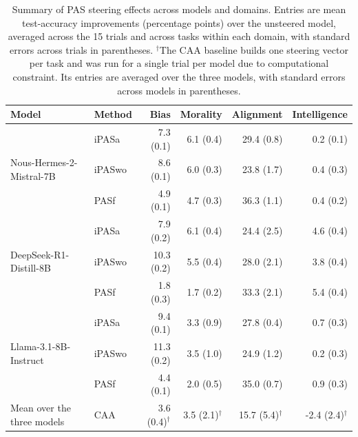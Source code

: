 \begin{table}[!htbp]
\centering
\small
\setlength{\tabcolsep}{4pt}
\renewcommand{\arraystretch}{0.9}
\setlength{\aboverulesep}{0.25ex}
\setlength{\belowrulesep}{0.25ex}
\begin{tabular}{llrrrr}
\toprule
\textbf{Model} & \textbf{Method} &
\textbf{Bias} & \textbf{Morality} &
\textbf{Alignment} & \textbf{Intelligence} \\
\midrule
\multirow{3}{*}{Nous-Hermes-2-Mistral-7B}
 & iPASa  & 7.3 (0.1) & 6.1 (0.4) & 29.4 (0.8) & 0.2 (0.1) \\
 & iPASwo & 8.6 (0.1) & 6.0 (0.3) & 23.8 (1.7) & 0.4 (0.3) \\
 & PASf   & 4.9 (0.1) & 4.7 (0.3) & 36.3 (1.1) & 0.4 (0.2) \\
\midrule
\multirow{3}{*}{DeepSeek-R1-Distill-8B}
 & iPASa  & 7.9 (0.2) & 6.1 (0.4) & 24.4 (2.5) & 4.6 (0.4) \\
 & iPASwo & 10.3 (0.2) & 5.5 (0.4) & 28.0 (2.1) & 3.8 (0.4) \\
 & PASf   & 1.8 (0.3) & 1.7 (0.2) & 33.3 (2.1) & 5.4 (0.4) \\
\midrule
\multirow{3}{*}{Llama-3.1-8B-Instruct}
 & iPASa  & 9.4 (0.1) & 3.3 (0.9) & 27.8 (0.4) & 0.7 (0.3) \\
 & iPASwo & 11.3 (0.2) & 3.5 (1.0) & 24.9 (1.2) & 0.2 (0.3) \\
 & PASf   & 4.4 (0.1) & 2.0 (0.5) & 35.0 (0.7) & 0.9 (0.3) \\
\midrule
Mean over the three models & CAA & 3.6 (0.4)$^{\dagger}$ & 3.5 (2.1)$^{\dagger}$ & 15.7 (5.4)$^{\dagger}$ & -2.4 (2.4)$^{\dagger}$ \\
\bottomrule
\end{tabular}
\caption{Summary of PAS steering effects across models and domains. Entries are mean test-accuracy improvements
(percentage points) over the unsteered model, averaged across the 15 trials and across tasks within each domain,
with standard errors across trials in parentheses. $^{\dagger}$The CAA baseline builds one steering vector per task
and was run for a single trial per model due to computational constraint. Its entries are averaged over the three
models, with standard errors across models in parentheses.}
\label{tab:main_summary}
\end{table}
